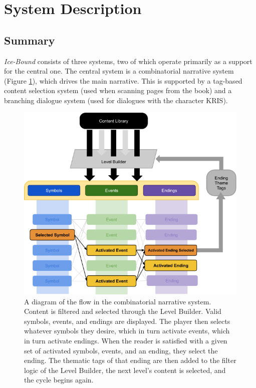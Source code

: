 \section{System Description}\label{sec:ice-bound-system-description}

\subsection{Summary}\label{subsec:ice-bound-summary}

\textit{Ice-Bound} consists of three systems, two of which operate primarily as a support for the central one. The central system is a combinatorial narrative system (Figure \ref{fig:ice-bound-system}), which drives the main narrative. This is supported by a tag-based content selection system (used when scanning pages from the book) and a branching dialogue system (used for dialogues with the character KRIS).


\begin{figure}
    \centering
    \includegraphics[width=\textwidth]{figures/2-Ice-Bound/ice-bound-system-diagram.png}
    \caption{A diagram of the flow in the combinatorial narrative system. Content is filtered and selected through the Level Builder. Valid symbols, events, and endings are displayed. The player then selects whatever symbols they desire, which in turn activate events, which in turn activate endings. When the reader is satisfied with a given set of activated symbols, events, and an ending, they select the ending. The thematic tags of that ending are then added to the filter logic of the Level Builder, the next level's content is selected, and the cycle begins again.}
    \label{fig:ice-bound-system}
\end{figure}

